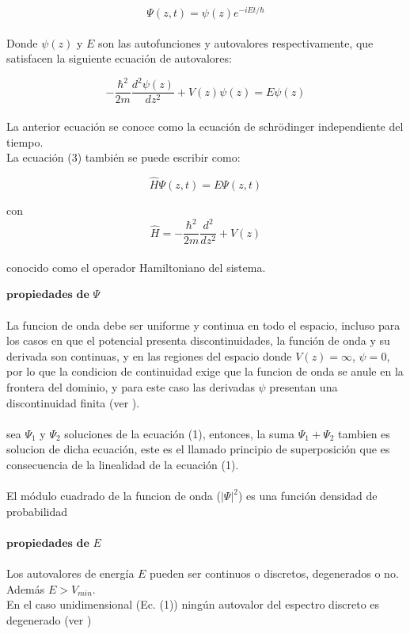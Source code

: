 \documentclass[9pt,twocolumn,twoside]{osajnl}
\begin{document}
\begin{equation}
    \Psi(z,t)=\psi(z)e^{-iEt/\hbar}
\end{equation} \\ 
Donde $\psi(z)$ y $E$ son las autofunciones y autovalores respectivamente, que satisfacen la siguiente ecuación de autovalores: 

\begin{equation}
    -\frac{\hbar^2}{2 m} \frac{d^2 \psi(z)}{d z^2} + V(z)\psi(z)=E \psi(z)
\end{equation} \\ 
La anterior ecuación se conoce como la ecuación de schrödinger independiente del tiempo.\\ 
La ecuación (3) también se puede escribir como:

\begin{equation}
    \hat{H}\Psi(z,t)=E\Psi(z,t)
\end{equation}

con $$\hat{H}= -\frac{\hbar^2}{2 m} \frac{d^2 }{d z^2} + V(z)$$
\\
conocido como el operador Hamiltoniano del sistema.
\newline

$\textbf{propiedades de}$ \hspace{} $ \Psi$ 
\vspace{1mm} \\ \\
La funcion de onda debe ser uniforme y continua en todo el espacio, incluso para los casos en que el potencial presenta discontinuidades, la función de onda y su derivada son continuas, y en las regiones del espacio donde $ V(z) = \infty$, \hspace{} $ \psi = 0$, por lo que la condicion de continuidad exige que la funcion de onda se anule en la frontera del dominio, y para  este caso las derivadas $\psi$ presentan una discontinuidad finita (ver \cite{Landau1983}). \\ \\
sea $\Psi_1$ y $\Psi_2$ soluciones de la ecuación (1), entonces, la suma $\Psi_1+\Psi_2$ tambien es solucion de dicha ecuación, este es el llamado principio de superposición que es consecuencia de la linealidad de la ecuación (1). \\ \\
El módulo cuadrado de la funcion de onda ($|\Psi|^2$) es una función densidad de probabilidad \\ \\
$\textbf{propiedades de}$ \hspace{} $ E$ 
\vspace{1mm} \\ \\
Los autovalores de energía $E$ pueden ser continuos o discretos, degenerados o no. Además $E>V_{min}$. 
\\ 
En el caso unidimensional (Ec. (1)) ningún autovalor del espectro discreto es degenerado (ver \cite{Landau1983}) 
\end{document}

